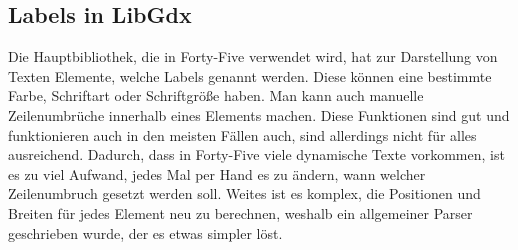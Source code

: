 
\renewcommand{\kapitelautor}{Autor: Felix Zwickelstorfer}
\subsection{Labels in LibGdx}\label{subsec:labels-in-gdx}
\renewcommand{\kapitelautor}{Autor: Felix Zwickelstorfer}

Die Hauptbibliothek, die in Forty-Five verwendet wird, hat zur Darstellung von Texten Elemente, welche Labels genannt werden.
Diese können eine bestimmte Farbe, Schriftart oder Schriftgröße haben.
Man kann auch manuelle Zeilenumbrüche innerhalb eines Elements machen.
Diese Funktionen sind gut und funktionieren auch in den meisten Fällen auch, sind allerdings nicht für alles ausreichend.
Dadurch, dass in Forty-Five viele dynamische Texte vorkommen, ist es zu viel Aufwand, jedes Mal per Hand es zu ändern, wann welcher Zeilenumbruch gesetzt werden soll.
Weites ist es komplex, die Positionen und Breiten für jedes Element neu zu berechnen, weshalb ein allgemeiner Parser geschrieben wurde, der es etwas simpler löst.
